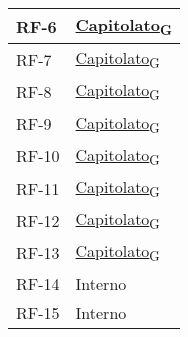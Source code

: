 \begin{longtable}{|>{\centering\arraybackslash}m{}|>{\centering\arraybackslash}m{}|}
	RF-6               & \href{https://7last.github.io/docs/rtb/documentazione-interna/glossario\#capitolato}{Capitolato\textsubscript{G}}                                                                                                        \\\hline
	RF-7               & \href{https://7last.github.io/docs/rtb/documentazione-interna/glossario\#capitolato}{Capitolato\textsubscript{G}}                                                                                                        \\\hline
	RF-8               & \href{https://7last.github.io/docs/rtb/documentazione-interna/glossario\#capitolato}{Capitolato\textsubscript{G}}                                                                                                        \\\hline
	RF-9               & \href{https://7last.github.io/docs/rtb/documentazione-interna/glossario\#capitolato}{Capitolato\textsubscript{G}}                                                                                                        \\\hline
	RF-10              & \href{https://7last.github.io/docs/rtb/documentazione-interna/glossario\#capitolato}{Capitolato\textsubscript{G}}                                                                                                        \\\hline
	RF-11              & \href{https://7last.github.io/docs/rtb/documentazione-interna/glossario\#capitolato}{Capitolato\textsubscript{G}}                                                                                                        \\\hline
	RF-12              & \href{https://7last.github.io/docs/rtb/documentazione-interna/glossario\#capitolato}{Capitolato\textsubscript{G}}                                                                                                        \\\hline
	RF-13              & \href{https://7last.github.io/docs/rtb/documentazione-interna/glossario\#capitolato}{Capitolato\textsubscript{G}}                                                                                                        \\\hline
	RF-14              & Interno                                                                                                           \\\hline
	RF-15              & Interno                                                                                                           \\\hline

\end{longtable}

